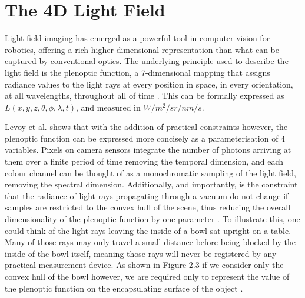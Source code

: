 \documentclass[openany]{book}
\begin{document}
\section{The 4D Light Field}
Light field imaging has emerged as a powerful tool in computer vision for robotics, offering a rich higher-dimensional representation than what can be captured by conventional optics. The underlying principle used to describe the light field is the plenoptic function, a 7-dimensional mapping that assigns radiance values to the light rays at every position in space, in every orientation, at all wavelengths, throughout all of time \cite{adelson1991plenoptic}. This can be formally expressed as $L(x,y,z,\theta, \phi, \lambda, t)$, and measured in $W/m^2/sr/nm/s$. 


Levoy et al. \cite{levoy1996lfrendering} shows that with the addition of practical constraints however, the plenoptic function can be expressed more concisely as a parameterisation of 4 variables. Pixels on camera sensors integrate the number of photons arriving at them over a finite period of time removing the temporal dimension, and each colour channel can be thought of as a monochromatic sampling of the light field, removing the spectral dimension. Additionally, and importantly, is the constraint that the radiance of light rays propagating through a vacuum do not change if samples are restricted to the convex hull of the scene, thus reducing the overall dimensionality of the plenoptic function by one parameter \cite{levoy1996lfrendering}. To illustrate this, one could think of the light rays leaving the inside of a bowl sat upright on a table. Many of those rays may only travel a small distance before being blocked by the inside of the bowl itself, meaning those rays will never be registered by any practical measurement device. As shown in Figure 2.3 if we consider only the convex hull of the bowl however, we are required only to represent the value of the plenoptic function on the encapsulating surface of the object \cite{gortler1996lumigraph}.
\end{document}
